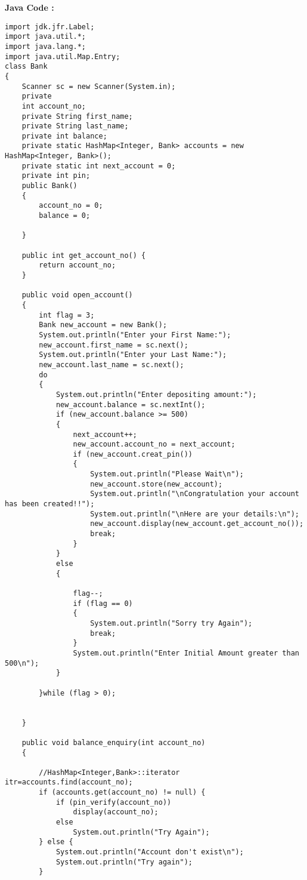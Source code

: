 \documentclass[11pt, a4paper]{article}
\begin{document}
\newpage
\textbf{ Java Code :}
\begin{lstlisting}
import jdk.jfr.Label;
import java.util.*;
import java.lang.*;
import java.util.Map.Entry;
class Bank
{
    Scanner sc = new Scanner(System.in);
    private
    int account_no;
    private String first_name;
    private String last_name;
    private int balance;
    private static HashMap<Integer, Bank> accounts = new HashMap<Integer, Bank>();
    private static int next_account = 0;
    private int pin;
    public Bank()
    {
        account_no = 0;
        balance = 0;

    }

    public int get_account_no() {
        return account_no;
    }

    public void open_account()
    {
        int flag = 3;
        Bank new_account = new Bank();
        System.out.println("Enter your First Name:");
        new_account.first_name = sc.next();
        System.out.println("Enter your Last Name:");
        new_account.last_name = sc.next();
        do
        {
            System.out.println("Enter depositing amount:");
            new_account.balance = sc.nextInt();
            if (new_account.balance >= 500)
            {
                next_account++;
                new_account.account_no = next_account;
                if (new_account.creat_pin())
                {
                    System.out.println("Please Wait\n");
                    new_account.store(new_account);
                    System.out.println("\nCongratulation your account has been created!!");
                    System.out.println("\nHere are your details:\n");
                    new_account.display(new_account.get_account_no());
                    break;
                }
            }
            else
            {

                flag--;
                if (flag == 0)
                {
                    System.out.println("Sorry try Again");
                    break;
                }
                System.out.println("Enter Initial Amount greater than 500\n");
            }

        }while (flag > 0);


    }

    public void balance_enquiry(int account_no)
    {

        //HashMap<Integer,Bank>::iterator itr=accounts.find(account_no);
        if (accounts.get(account_no) != null) {
            if (pin_verify(account_no))
                display(account_no);
            else
                System.out.println("Try Again");
        } else {
            System.out.println("Account don't exist\n");
            System.out.println("Try again");
        }



\end{lstlisting}
\end{document}
